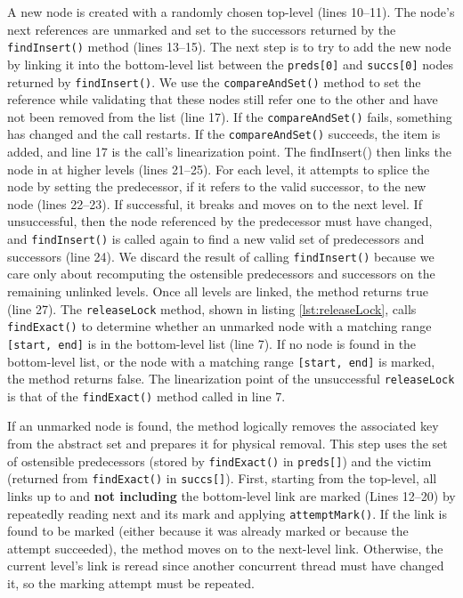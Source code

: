 A new node is created with a randomly chosen top-level (lines 10--11). The node's next references are unmarked and set to the successors returned by the \texttt{findInsert()} method (lines 13--15).
The next step is to try to add the new node by linking it into the bottom-level list between the \texttt{preds[0]} and \texttt{succs[0]} nodes returned by \texttt{findInsert()}. We use the \texttt{compareAndSet()} method to set the reference while validating that these nodes still refer one to the other and have not been removed from the list (line 17). If the  \texttt{compareAndSet()} fails, something has changed and the call restarts. If the  \texttt{compareAndSet()} succeeds, the item is added, and line 17 is the call's linearization point.
The {findInsert()} then links the node in at higher levels (lines 21--25). For each level, it attempts to splice the node by setting the predecessor, if it refers to the valid successor, to the new node (lines 22--23). If successful, it breaks and moves on to the next level. If unsuccessful, then the node referenced by the predecessor must have changed, and \texttt{findInsert()} is called again to find a new valid set of predecessors and successors (line 24). We discard the result of calling \texttt{findInsert()} because we care only about recomputing the ostensible predecessors and successors on the remaining unlinked levels. Once all levels are linked, the method returns true (line 27).
The \texttt{releaseLock} method, shown in listing \ref{lst:releaseLock}, calls \texttt{findExact()} to determine whether an unmarked node with a matching range \texttt{[start, end]} is in the bottom-level list (line 7). If no node is found in the bottom-level list, or the node with a matching range \texttt{[start, end]} is marked, the method returns false. The linearization point of the unsuccessful \texttt{releaseLock} is that of the \texttt{findExact()} method called in line 7. 

If an unmarked node is found, the method logically removes the associated key from the abstract set and prepares it for physical removal. This step uses the set of ostensible predecessors (stored by \texttt{findExact()} in \texttt{preds[]}) and the victim (returned from \texttt{findExact()} in \texttt{succs[]}). First, starting from the top-level, all links up to and \textbf{not including} the bottom-level link are marked (Lines 12--20) by repeatedly reading next and its mark and applying \texttt{attemptMark()}. If the link is found to be marked (either because it was already marked or because the attempt succeeded), the method moves on to the next-level link. Otherwise, the current level's link is reread since another concurrent thread must have changed it, so the marking attempt must be repeated. 

